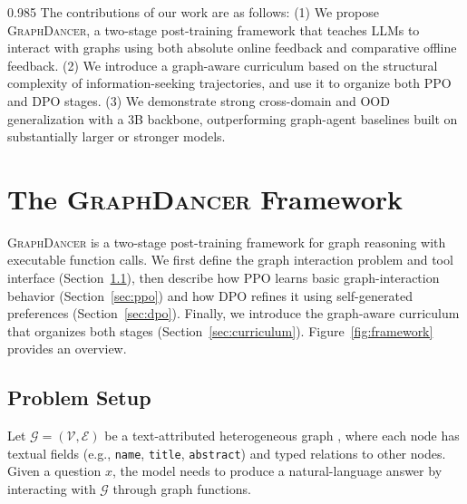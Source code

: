 \documentclass[11pt]{article}
\newcommand{\ours}{\textsc{GraphDancer}\xspace}
\begin{document}
\begin{spacing}{0.985}
The contributions of our work are as follows:
(1) We propose \ours, a two-stage post-training framework that teaches LLMs to interact with graphs using both absolute online feedback and comparative offline feedback.
(2) We introduce a graph-aware curriculum based on the structural complexity of information-seeking trajectories, and use it to organize both PPO and DPO stages.
(3) We demonstrate strong cross-domain and OOD generalization with a 3B backbone, outperforming graph-agent baselines built on substantially larger or stronger models.


\section{The \ours Framework}

\ours is a two-stage post-training framework for graph reasoning with executable function calls.
We first define the graph interaction problem and tool interface (Section~\ref{sec:setup}), then describe how PPO learns basic graph-interaction behavior (Section~\ref{sec:ppo}) and how DPO refines it using self-generated preferences (Section~\ref{sec:dpo}).
Finally, we introduce the graph-aware curriculum that organizes both stages (Section~\ref{sec:curriculum}).
Figure~\ref{fig:framework} provides an overview.

\subsection{Problem Setup}
\label{sec:setup}
Let $\mathcal{G}=(\mathcal{V},\mathcal{E})$ be a text-attributed heterogeneous graph \cite{jin2023heterformer}, where each node has textual fields (e.g., \texttt{name}, \texttt{title}, \texttt{abstract}) and typed relations to other nodes.
Given a question $x$, the model needs to produce a natural-language answer by interacting with $\mathcal{G}$ through graph functions.


\end{spacing}
\end{document}
